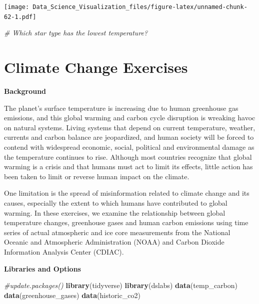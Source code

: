 \documentclass[
]{article}
\newenvironment{Shaded}{\begin{snugshade}}{\end{snugshade}}
\newcommand{\CommentTok}[1]{\textcolor[rgb]{0.56,0.35,0.01}{\textit{#1}}}
\newcommand{\KeywordTok}[1]{\textcolor[rgb]{0.13,0.29,0.53}{\textbf{#1}}}
\newcommand{\NormalTok}[1]{#1}
\begin{document}
\texttt{[image: Data\_Science\_Visualization\_files/figure-latex/unnamed-chunk-62-1.pdf]}

\begin{Shaded}
\begin{Highlighting}[]
\CommentTok{# Which star type has the lowest temperature?}
\end{Highlighting}
\end{Shaded}

\hypertarget{climate-change-exercises}{%
\section{Climate Change Exercises}\label{climate-change-exercises}}

\textbf{Background}

The planet's surface temperature is increasing due to human greenhouse
gas emissions, and this global warming and carbon cycle disruption is
wreaking havoc on natural systems. Living systems that depend on current
temperature, weather, currents and carbon balance are jeopardized, and
human society will be forced to contend with widespread economic,
social, political and environmental damage as the temperature continues
to rise. Although most countries recognize that global warming is a
crisis and that humans must act to limit its effects, little action has
been taken to limit or reverse human impact on the climate.

One limitation is the spread of misinformation related to climate change
and its causes, especially the extent to which humans have contributed
to global warming. In these exercises, we examine the relationship
between global temperature changes, greenhouse gases and human carbon
emissions using time series of actual atmospheric and ice core
measurements from the National Oceanic and Atmospheric Administration
(NOAA) and Carbon Dioxide Information Analysis Center (CDIAC).

\textbf{Libraries and Options}

\begin{Shaded}
\begin{Highlighting}[]
\CommentTok{#update.packages()}
\KeywordTok{library}\NormalTok{(tidyverse)}
\KeywordTok{library}\NormalTok{(dslabs)}
\KeywordTok{data}\NormalTok{(temp_carbon)}
\KeywordTok{data}\NormalTok{(greenhouse_gases)}
\KeywordTok{data}\NormalTok{(historic_co2)}
\end{Highlighting}
\end{Shaded}
\end{document}
